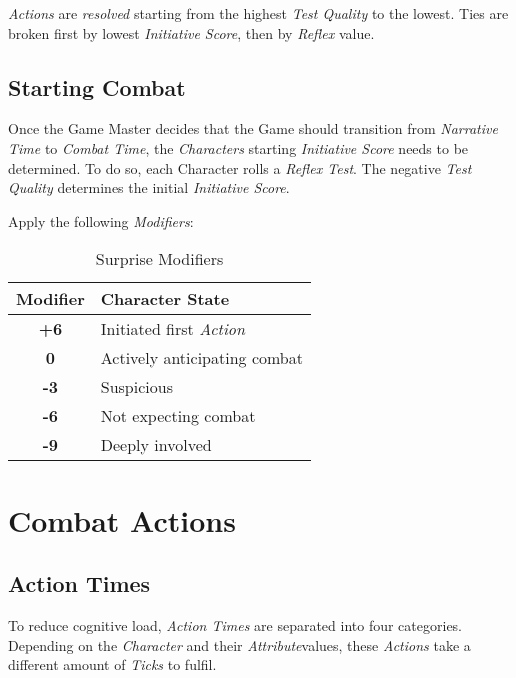 \emph{Actions} are \emph{resolved} starting from the highest \emph{Test Quality}
to the lowest. Ties are broken first by lowest \emph{Initiative Score}, then by
\emph{Reflex} value.

\subsection{Starting Combat}

Once the Game Master decides that the Game should transition from
\emph{Narrative Time} to \emph{Combat Time}, the \emph{Characters} starting
\emph{Initiative Score} needs to be determined. To do so, each Character rolls
a \emph{Reflex Test}. The negative \emph{Test Quality} determines the initial
\emph{Initiative Score}.

Apply the following \emph{Modifiers}:

\begin{table}[htb]
    \caption[Surprise Modifiers]{Surprise Modifiers}
    \label{tab:surprise modifiers}
    \centering
    \begin{tabular}{cl}
        \toprule
        \textbf{Modifier} & \textbf{Character State}        \\
        \midrule
        \textbf{+6}       & Initiated first \textit{Action} \\
        \textbf{0}        & Actively anticipating combat    \\
        \textbf{-3}       & Suspicious                      \\
        \textbf{-6}       & Not expecting combat            \\
        \textbf{-9}       & Deeply involved                 \\
        \bottomrule
    \end{tabular}
\end{table}

\section{Combat Actions}

\subsection{Action Times}
To reduce cognitive load, \emph{Action Times} are separated into four categories.
Depending
on the \emph{Character} and their \emph{Attribute}values, these \emph{Actions} take
a different amount of \emph{Ticks} to fulfil.

